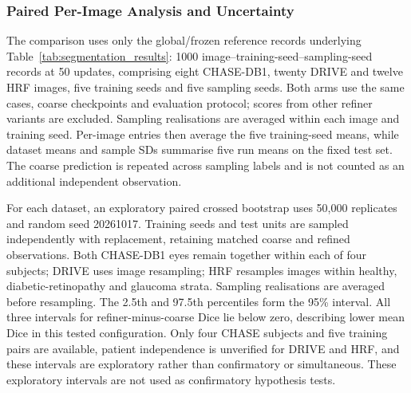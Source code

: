 \documentclass[jimaging,article,submit,pdftex,moreauthors]
  {Definitions/mdpi}
\providecommand{\linelabel}[1]{}
\newcommand{\seclabel}[1]{\linelabel{rev:sec:#1}}
\begin{document}
\subsubsection{Paired Per-Image Analysis and Uncertainty}
\label{sec:paired_per_image}
\seclabel{paired_per_image}
The comparison uses only the global/frozen reference records underlying Table~\ref{tab:segmentation_results}: 1000 image--training-seed--sampling-seed records at 50 updates, comprising eight CHASE-DB1, twenty DRIVE and twelve HRF images, five training seeds and five sampling seeds. Both arms use the same cases, coarse checkpoints and evaluation protocol; scores from other refiner variants are excluded. Sampling realisations are averaged within each image and training seed. Per-image entries then average the five training-seed means, while dataset means and sample SDs summarise five run means on the fixed test set. The coarse prediction is repeated across sampling labels and is not counted as an additional independent observation.

For each dataset, an exploratory paired crossed bootstrap uses 50,000 replicates and random seed 20261017. Training seeds and test units are sampled independently with replacement, retaining matched coarse and refined observations. Both CHASE-DB1 eyes remain together within each of four subjects; DRIVE uses image resampling; HRF resamples images within healthy, diabetic-retinopathy and glaucoma strata. Sampling realisations are averaged before resampling. The 2.5th and 97.5th percentiles form the 95\% interval. All three intervals for refiner-minus-coarse Dice lie below zero, describing lower mean Dice in this tested configuration. Only four CHASE subjects and five training pairs are available, patient independence is unverified for DRIVE and HRF, and these intervals are exploratory rather than confirmatory or simultaneous. These exploratory intervals are not used as confirmatory hypothesis tests.
\end{document}
